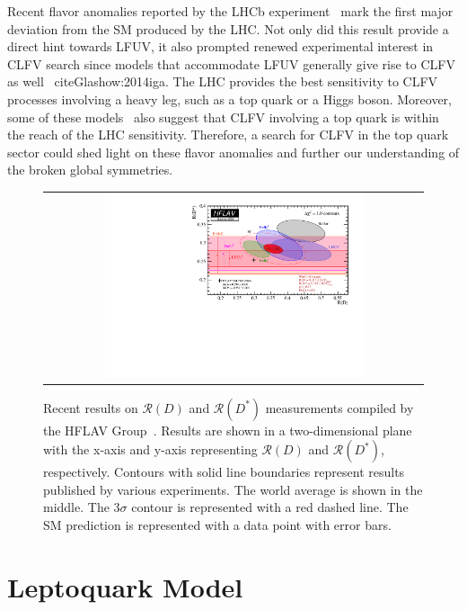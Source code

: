 Recent flavor anomalies reported by the \ac{LHCb} experiment~\cite{LHCb:2023zxo} mark the first major deviation from the SM produced by the \ac{LHC}. Not only did this result provide a direct hint towards \ac{LFUV}, it also prompted renewed experimental interest in \ac{CLFV} search since models that accommodate \ac{LFUV} generally give rise to \ac{CLFV} as well ~cite{Glashow:2014iga}. The \ac{LHC} provides the best sensitivity to \ac{CLFV} processes involving a heavy leg, such as a top quark or a Higgs boson. Moreover, some of these models~\cite{Kim:2018oih} also suggest that \ac{CLFV} involving a top quark is within the reach of the \ac{LHC} sensitivity. Therefore, a search for \ac{CLFV} in the top quark sector could shed light on these flavor anomalies and further our understanding of the broken global symmetries.

\begin{figure}[tbh!]
 \begin{center}
 \begin{tabular}{c}
 \includegraphics[width=0.7\textwidth]{figures/Part1/BSM/RD}
 \end{tabular}
 \caption{Recent results on $\mathcal{R}(D)$ and $\mathcal{R}(D^{*})$ measurements compiled by the HFLAV Group~\cite{HFLAV}. Results are shown in a two-dimensional plane with the x-axis and y-axis representing $\mathcal{R}(D)$ and $\mathcal{R}(D^{*})$, respectively. Contours with solid line boundaries represent results published by various experiments. The world average is shown in the middle. The 3$\sigma$ contour is represented with a red dashed line. The \ac{SM} prediction is represented with a data point with error bars.}
 \label{fig:RD}
 \end{center}
\end{figure}

\section{Leptoquark Model}
\label{sec:Leptoquark}

